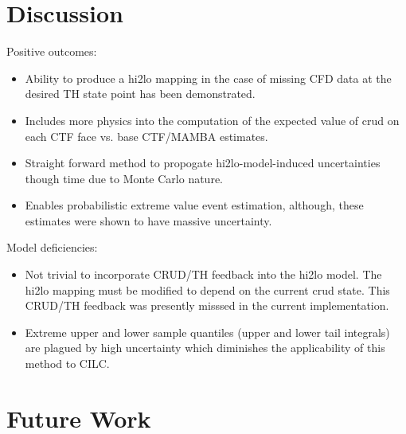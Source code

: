 \section{Discussion}

Positive outcomes:

\begin{itemize}
	\item  Ability to produce a hi2lo mapping in the case of missing CFD data at the desired TH state point has been demonstrated.
	\item  Includes more physics into the computation of the expected value of crud on each CTF face vs. base CTF/MAMBA estimates.
	\item  Straight forward method to propogate hi2lo-model-induced uncertainties though time due to Monte Carlo nature.
	\item  Enables probabilistic extreme value event estimation, although, these estimates were shown to have massive uncertainty.
\end{itemize}

\noindent Model deficiencies:  

\begin{itemize}
	\item  Not trivial to incorporate CRUD/TH feedback into the hi2lo model.  The hi2lo mapping must be modified to depend on the current crud state.  This CRUD/TH feedback was presently misssed in the current implementation.
	\item  Extreme upper and lower sample quantiles (upper and lower tail integrals) are plagued by high uncertainty which diminishes the applicability of this method to CILC.  
\end{itemize}

\section{Future Work}

